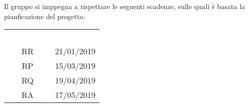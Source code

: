 Il gruppo \gruppo\space si imppegna a rispettare le seguenti scadenze, sulle quali
è basata la pianficazione del progetto.

\renewcommand{\arraystretch}{1}
\begin{center}
    \begin{tabular}{| c | c | }
        \hline
        \rowcolor{greySWEight}
        \textcolor{white}{\textbf{Revisione}} & \textcolor{white}{\textbf{Scadenza}}\\
        RR & 21/01/2019 \\
        RP & 15/03/2019 \\
        RQ & 19/04/2019 \\
        RA & 17/05/2019 \\
        \hline
    \end{tabular}
\end{center}

   